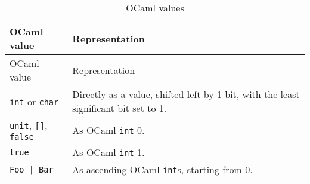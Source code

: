 \hypertarget{table20-1_ocaml}{}
\begin{longtable}[]{@{}ll@{}}
\caption{OCaml values}\tabularnewline
\toprule
\begin{minipage}[b]{0.42\columnwidth}\raggedright
OCaml value\strut
\end{minipage} & \begin{minipage}[b]{0.52\columnwidth}\raggedright
Representation\strut
\end{minipage}\tabularnewline
\midrule
\endfirsthead
\toprule
\begin{minipage}[b]{0.42\columnwidth}\raggedright
OCaml value\strut
\end{minipage} & \begin{minipage}[b]{0.52\columnwidth}\raggedright
Representation\strut
\end{minipage}\tabularnewline
\midrule
\endhead
\begin{minipage}[t]{0.42\columnwidth}\raggedright
\passthrough{\lstinline!int!} or \passthrough{\lstinline!char!}\strut
\end{minipage} & \begin{minipage}[t]{0.52\columnwidth}\raggedright
Directly as a value, shifted left by 1 bit, with the least significant
bit set to 1.\strut
\end{minipage}\tabularnewline
\begin{minipage}[t]{0.42\columnwidth}\raggedright
\passthrough{\lstinline!unit!}, \passthrough{\lstinline![]!},
\passthrough{\lstinline!false!}\strut
\end{minipage} & \begin{minipage}[t]{0.52\columnwidth}\raggedright
As OCaml \passthrough{\lstinline!int!} 0.\strut
\end{minipage}\tabularnewline
\begin{minipage}[t]{0.42\columnwidth}\raggedright
\passthrough{\lstinline!true!}\strut
\end{minipage} & \begin{minipage}[t]{0.52\columnwidth}\raggedright
As OCaml \passthrough{\lstinline!int!} 1.\strut
\end{minipage}\tabularnewline
\begin{minipage}[t]{0.42\columnwidth}\raggedright
\passthrough{\lstinline!Foo | Bar!}\strut
\end{minipage} & \begin{minipage}[t]{0.52\columnwidth}\raggedright
As ascending OCaml \passthrough{\lstinline!int!}s, starting from
0.\strut
\end{minipage}\tabularnewline

\end{longtable}

